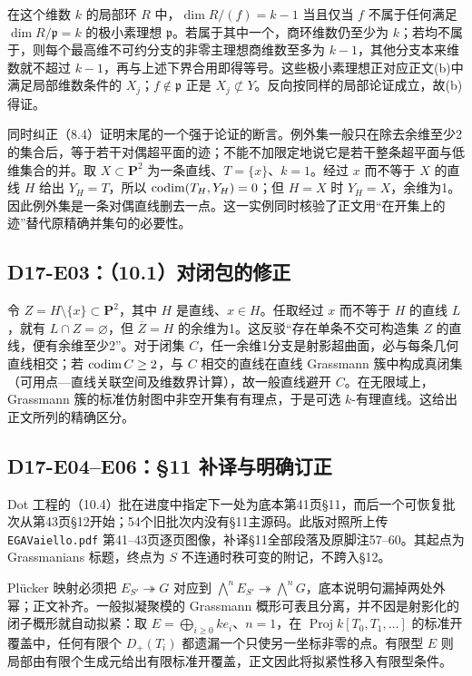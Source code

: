 在这个维数 $k$ 的局部环 $R$ 中，$\dim R/(f)=k-1$ 当且仅当 $f$ 不属于任何满足 $\dim R/\mathfrak p=k$ 的极小素理想 $\mathfrak p$。若属于其中一个，商环维数仍至少为 $k$；若均不属于，则每个最高维不可约分支的非零主理想商维数至多为 $k-1$，其他分支本来维数就不超过 $k-1$，再与上述下界合用即得等号。这些极小素理想正对应正文(b)中满足局部维数条件的 $X_j$；$f\notin\mathfrak p$ 正是 $X_j\not\subset Y$。反向按同样的局部论证成立，故(b)得证。

同时纠正（8.4）证明末尾的一个强于论证的断言。例外集一般只在除去余维至少2的集合后，等于若干对偶超平面的迹；不能不加限定地说它是若干整条超平面与低维集合的并。取 $X\subset\mathbf P^2$ 为一条直线、$T=\{x\}$、$k=1$。经过 $x$ 而不等于 $X$ 的直线 $H$ 给出 $Y_H=T$，所以 $\operatorname{codim}(T_H,Y_H)=0$；但 $H=X$ 时 $Y_H=X$，余维为1。因此例外集是一条对偶直线删去一点。这一实例同时核验了正文用“在开集上的迹”替代原精确并集句的必要性。

\subsection*{D17-E03：（10.1）对闭包的修正}
令 $Z=H\setminus\{x\}\subset\mathbf P^2$，其中 $H$ 是直线、$x\in H$。任取经过 $x$ 而不等于 $H$ 的直线 $L$，就有 $L\cap Z=\varnothing$，但 $\overline Z=H$ 的余维为1。这反驳“存在单条不交可构造集 $Z$ 的直线，便有余维至少2”。对于闭集 $C$，任一余维1分支是射影超曲面，必与每条几何直线相交；若 $\operatorname{codim} C\geq2$，与 $C$ 相交的直线在直线 Grassmann 簇中构成真闭集（可用点—直线关联空间及维数界计算），故一般直线避开 $C$。在无限域上，Grassmann 簇的标准仿射图中非空开集有有理点，于是可选 $k$-有理直线。这给出正文所列的精确区分。

\subsection*{D17-E04--E06：§11 补译与明确订正}
Dot 工程的（10.4）批在进度中指定下一处为底本第41页§11，而后一个可恢复批次从第43页§12开始；54个旧批次内没有§11主源码。此版对照所上传 \texttt{EGAVaiello.pdf} 第41--43页逐页图像，补译§11全部段落及原脚注57--60。其起点为 Grassmanians 标题，终点为 $S$ 不连通时秩可变的附记，不跨入§12。

Plücker 映射必须把 $E_{S'}\twoheadrightarrow G$ 对应到 $\bigwedge^nE_{S'}\twoheadrightarrow\bigwedge^nG$，底本说明句漏掉两处外幂；正文补齐。一般拟凝聚模的 Grassmann 概形可表且分离，并不因是射影化的闭子概形就自动拟紧：取 $E=\bigoplus_{i\geq0}ke_i$、$n=1$，在 $\operatorname{Proj}k[T_0,T_1,\ldots]$ 的标准开覆盖中，任何有限个 $D_+(T_i)$ 都遗漏一个只使另一坐标非零的点。有限型 $E$ 则局部由有限个生成元给出有限标准开覆盖，正文因此将拟紧性移入有限型条件。

